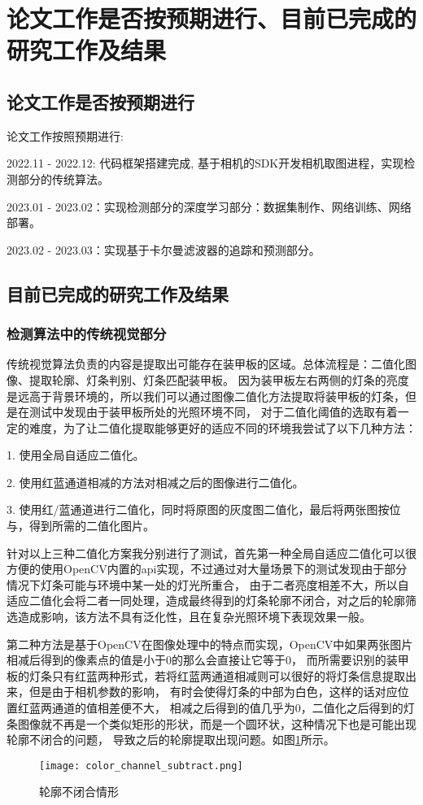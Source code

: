 \section{论文工作是否按预期进行、目前已完成的研究工作及结果}
\subsection{论文工作是否按预期进行}
论文工作按照预期进行: \par
2022.11 - 2022.12: 代码框架搭建完成, 基于相机的SDK开发相机取图进程，实现检测部分的传统算法。\par
2023.01 - 2023.02：实现检测部分的深度学习部分：数据集制作、网络训练、网络部署。\par
2023.02 - 2023.03：实现基于卡尔曼滤波器的追踪和预测部分。\par
\subsection{目前已完成的研究工作及结果}
\subsubsection{检测算法中的传统视觉部分}
传统视觉算法负责的内容是提取出可能存在装甲板的区域。总体流程是：二值化图像、提取轮廓、灯条判别、灯条匹配装甲板。
因为装甲板左右两侧的灯条的亮度是远高于背景环境的，所以我们可以通过图像二值化方法提取将装甲板的灯条，但是在测试中发现由于装甲板所处的光照环境不同，
对于二值化阈值的选取有着一定的难度，为了让二值化提取能够更好的适应不同的环境我尝试了以下几种方法：\par
1. 使用全局自适应二值化。\par
2. 使用红蓝通道相减的方法对相减之后的图像进行二值化。\par
3. 使用红/蓝通道进行二值化，同时将原图的灰度图二值化，最后将两张图按位与，得到所需的二值化图片。\par

针对以上三种二值化方案我分别进行了测试，首先第一种全局自适应二值化可以很方便的使用OpenCV内置的api实现，不过通过对大量场景下的测试发现由于部分情况下灯条可能与环境中某一处的灯光所重合，
由于二者亮度相差不大，所以自适应二值化会将二者一同处理，造成最终得到的灯条轮廓不闭合，对之后的轮廓筛选造成影响，该方法不具有泛化性，且在复杂光照环境下表现效果一般。\par

第二种方法是基于OpenCV在图像处理中的特点而实现，OpenCV中如果两张图片相减后得到的像素点的值是小于0的那么会直接让它等于0，
而所需要识别的装甲板的灯条只有红蓝两种形式，若将红蓝两通道相减则可以很好的将灯条信息提取出来，但是由于相机参数的影响，
有时会使得灯条的中部为白色，这样的话对应位置红蓝两通道的值相差便不大，
相减之后得到的值几乎为0，二值化之后得到的灯条图像就不再是一个类似矩形的形状，而是一个圆环状，这种情况下也是可能出现轮廓不闭合的问题，
导致之后的轮廓提取出现问题。如图\ref{轮廓不闭合情形}所示。\par
\begin{figure}[H]
    \centering
    \texttt{[image: color\_channel\_subtract.png]} 
    \caption{轮廓不闭合情形} 
    \label{轮廓不闭合情形}
\end{figure}


